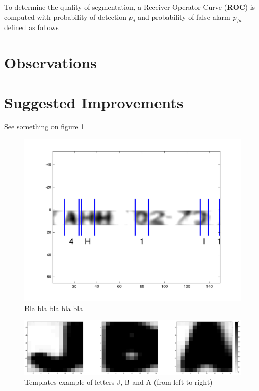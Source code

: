 \documentclass[a4paper,12pt]{article}
\begin{document}
To determine the quality of segmentation, a Receiver Operator Curve
(\textbf{ROC}) is computed with probability of detection $p_d$ and
probability of false alarm $p_{fa}$ defined as follows


\section{Observations}

\section{Suggested Improvements}


See something on figure \ref{fig:detection}
\begin{figure}[htp]
\centering
\includegraphics[width=\linewidth]{pics/detection.png}
\caption{Bla bla bla bla bla} 
\label{fig:detection}
\end{figure}

\begin{figure}[htp]
\centering
\includegraphics[width=\linewidth]{pics/jba.png}
\caption{Templates example of letters J, B and A (from left to right)} 
\label{fig:templates}
\end{figure}
\end{document}
